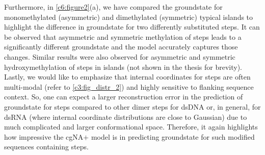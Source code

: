 Furthermore, in \cref{c6:figure2}(a), we have compared the groundstate for monomethylated (asymmetric) and dimethylated (symmetric) typical \cpg islands to highlight the difference in groundstate for two differently substituted \cpg steps. 
It can be observed that asymmetric and symmetric methylation of \cpg steps leads to a significantly different groundstate and the model accurately captures those changes.
Similar results were also observed for asymmetric and symmetric hydroxymethylation of \cpg steps in \cpg islands (not shown in the thesis for brevity). 
Lastly, we would like to emphasize that internal coordinates for \cpg steps are often multi-modal (refer to \cref{c3:fig_distr_2}) and highly sensitive to flanking sequence context.
So, one can expect a larger reconstruction error in the prediction of groundstate for \cpg steps compared to other dimer steps for dsDNA or, in general, for dsRNA (where internal coordinate distributions are close to Gaussian) due to much complicated and larger conformational space.
Therefore, it again highlights how impressive the cgNA$+$ model is in predicting groundstate for such modified sequences containing \cpg steps.

